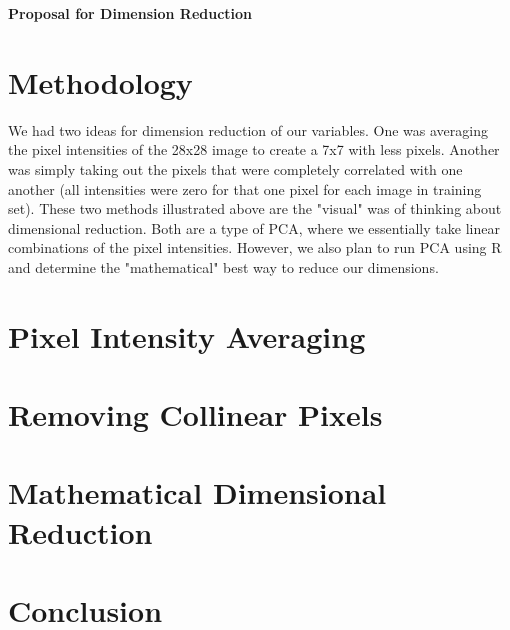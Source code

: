 \documentclass[10pt]{extarticle}
\begin{document}
\noindent
{}

\begin{center}
\LARGE{\textbf{Proposal for Dimension Reduction}}
\end{center}

\section{Methodology}
\blank

We had two ideas for dimension reduction of our variables. One was averaging the pixel intensities of the 28x28 image to create a 7x7 with less pixels. Another was simply taking out the pixels that were completely correlated with one another (all intensities were zero for that one pixel for each image in training set). These two methods illustrated above are the "visual" was of thinking about dimensional reduction. Both are a type of PCA, where we essentially take linear combinations of the pixel intensities. However, we also plan to run PCA using R and determine the "mathematical" best way to reduce our dimensions.

\section{Pixel Intensity Averaging}
\blank


\section{Removing Collinear Pixels}
\blank


\section{Mathematical Dimensional Reduction}
\blank


\section{Conclusion}
\blank 
\end{document}
